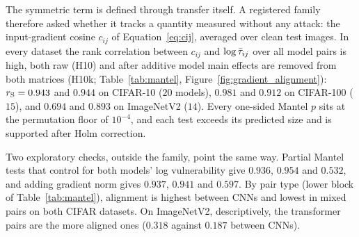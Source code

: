The symmetric term is defined through transfer itself. A registered family therefore asked whether it tracks a quantity measured without any attack: the input-gradient cosine $c_{ij}$ of Equation~\eqref{eq:cij}, averaged over clean test images. In every dataset the rank correlation between $c_{ij}$ and $\log\bar{\tau}_{ij}$ over all model pairs is high, both raw (H10) and after additive model main effects are removed from both matrices (H10k; Table~\ref{tab:mantel}, Figure~\ref{fig:gradient_alignment}): $r_{\mathrm{S}} = 0.943$ and $0.944$ on CIFAR-10 ($20$ models), $0.981$ and $0.912$ on CIFAR-100 ($15$), and $0.694$ and $0.893$ on ImageNetV2 ($14$). Every one-sided Mantel $p$ sits at the permutation floor of $10^{-4}$, and each test exceeds its predicted size and is supported after Holm correction.

Two exploratory checks, outside the family, point the same way. Partial Mantel tests that control for both models' log vulnerability give $0.936$, $0.954$ and $0.532$, and adding gradient norm gives $0.937$, $0.941$ and $0.597$. By pair type (lower block of Table~\ref{tab:mantel}), alignment is highest between CNNs and lowest in mixed pairs on both CIFAR datasets. On ImageNetV2, descriptively, the transformer pairs are the more aligned ones ($0.318$ against $0.187$ between CNNs).

